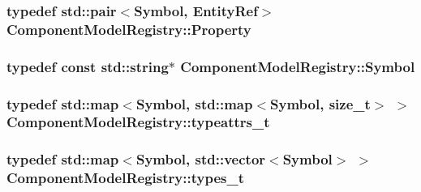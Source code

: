 \hypertarget{class_component_model_registry_aec59450251d175f19c49a0c020ba3b8f}{
\subsubsection[{Property}]{\setlength{\rightskip}{0pt plus 5cm}typedef std\+::pair$<${\bf Symbol}, {\bf Entity\+Ref}$>$ {\bf Component\+Model\+Registry\+::\+Property}\hspace{0.3cm}{\ttfamily [protected]}}}\label{class_component_model_registry_aec59450251d175f19c49a0c020ba3b8f}
\hypertarget{class_component_model_registry_a76ae77a9f2c8f03598f7c45e3450cc49}{
\subsubsection[{Symbol}]{\setlength{\rightskip}{0pt plus 5cm}typedef const std\+::string$\ast$ {\bf Component\+Model\+Registry\+::\+Symbol}\hspace{0.3cm}{\ttfamily [protected]}}}\label{class_component_model_registry_a76ae77a9f2c8f03598f7c45e3450cc49}
\hypertarget{class_component_model_registry_a901d7abbb42dbbf185d37d0a342e6564}{
\subsubsection[{typeattrs\+\_\+t}]{\setlength{\rightskip}{0pt plus 5cm}typedef std\+::map$<${\bf Symbol}, std\+::map$<${\bf Symbol}, size\+\_\+t$>$ $>$ {\bf Component\+Model\+Registry\+::typeattrs\+\_\+t}\hspace{0.3cm}{\ttfamily [protected]}}}\label{class_component_model_registry_a901d7abbb42dbbf185d37d0a342e6564}
\hypertarget{class_component_model_registry_a8fb4d43b83df65428c1701f659a8acff}{
\subsubsection[{types\+\_\+t}]{\setlength{\rightskip}{0pt plus 5cm}typedef std\+::map$<${\bf Symbol}, std\+::vector$<${\bf Symbol}$>$ $>$ {\bf Component\+Model\+Registry\+::types\+\_\+t}\hspace{0.3cm}{\ttfamily [protected]}}}\label{class_component_model_registry_a8fb4d43b83df65428c1701f659a8acff}


